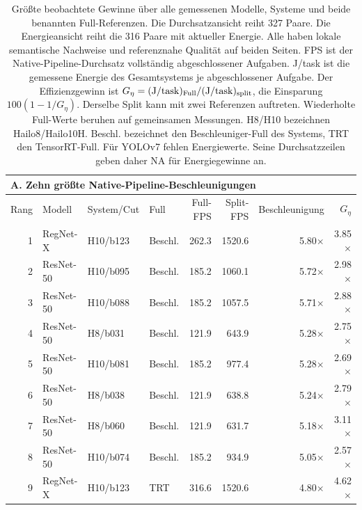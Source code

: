 \begin{table}[t]
\centering
\caption{Größte beobachtete Gewinne über alle gemessenen Modelle, Systeme und beide benannten Full-Referenzen. Die Durchsatzansicht reiht 327 Paare. Die Energieansicht reiht die 316 Paare mit aktueller Energie. Alle haben lokale semantische Nachweise und referenznahe Qualität auf beiden Seiten. FPS ist der Native-Pipeline-Durchsatz vollständig abgeschlossener Aufgaben. J/task ist die gemessene Energie des Gesamtsystems je abgeschlossener Aufgabe. Der Effizienzgewinn ist $G_\eta=({\rm J/task})_{\rm Full}/({\rm J/task})_{\rm split}$, die Einsparung $100(1-1/G_\eta)$. Derselbe Split kann mit zwei Referenzen auftreten. Wiederholte Full-Werte beruhen auf gemeinsamen Messungen. H8/H10 bezeichnen Hailo8/Hailo10H. Beschl. bezeichnet den Beschleuniger-Full des Systems, TRT den TensorRT-Full. Für YOLOv7 fehlen Energiewerte. Seine Durchsatzzeilen geben daher NA für Energiegewinne an.}
\label{tab:best-cases-screened-global}
\begingroup
\fontsize{9}{10.4}\selectfont
\setlength{\tabcolsep}{3.5pt}
\renewcommand{\arraystretch}{1.05}
\begin{tabular*}{\textwidth}{@{\extracolsep{\fill}}rlllrrrr@{}}
\toprule
\multicolumn{8}{l}{\textbf{A. Zehn größte Native-Pipeline-Beschleunigungen}}\\
\midrule
Rang & Modell & System/Cut & Full & Full-FPS & Split-FPS & Beschleunigung & $G_\eta$\\
\midrule
1 & RegNet-X & H10/b123 & Beschl. & 262.3 & 1520.6 & 5.80$\times$ & 3.85$\times$\\
2 & ResNet-50 & H10/b095 & Beschl. & 185.2 & 1060.1 & 5.72$\times$ & 2.98$\times$\\
3 & ResNet-50 & H10/b088 & Beschl. & 185.2 & 1057.5 & 5.71$\times$ & 2.88$\times$\\
4 & ResNet-50 & H8/b031 & Beschl. & 121.9 & 643.9 & 5.28$\times$ & 2.75$\times$\\
5 & ResNet-50 & H10/b081 & Beschl. & 185.2 & 977.4 & 5.28$\times$ & 2.69$\times$\\
6 & ResNet-50 & H8/b038 & Beschl. & 121.9 & 638.8 & 5.24$\times$ & 2.79$\times$\\
7 & ResNet-50 & H8/b060 & Beschl. & 121.9 & 631.7 & 5.18$\times$ & 3.11$\times$\\
8 & ResNet-50 & H10/b074 & Beschl. & 185.2 & 934.9 & 5.05$\times$ & 2.57$\times$\\
9 & RegNet-X & H10/b123 & TRT & 316.6 & 1520.6 & 4.80$\times$ & 4.62$\times$\\

\end{tabular*}
\end{table}
